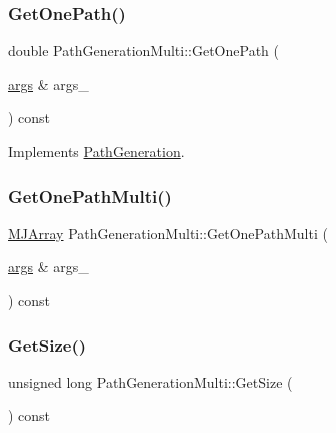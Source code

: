 \subsubsection{\texorpdfstring{Get\+One\+Path()}{GetOnePath()}}
{\footnotesize\ttfamily double Path\+Generation\+Multi\+::\+Get\+One\+Path (\begin{DoxyParamCaption}\item[{\hyperlink{path__generation_8h_a75c13cde2074f502cc4348c70528572d}{args} \&}]{args\+\_\+ }\end{DoxyParamCaption}) const\hspace{0.3cm}{\ttfamily [virtual]}}



Implements \hyperlink{classPathGeneration_a9a64a37f4dd9b2b3ef84f3cb66aed843}{Path\+Generation}.

\hypertarget{classPathGenerationMulti_aeae71235d01a98759c1d075694e8096e}{}\label{classPathGenerationMulti_aeae71235d01a98759c1d075694e8096e} 
\subsubsection{\texorpdfstring{Get\+One\+Path\+Multi()}{GetOnePathMulti()}}
{\footnotesize\ttfamily \hyperlink{classMJArray}{M\+J\+Array} Path\+Generation\+Multi\+::\+Get\+One\+Path\+Multi (\begin{DoxyParamCaption}\item[{\hyperlink{path__generation_8h_a75c13cde2074f502cc4348c70528572d}{args} \&}]{args\+\_\+ }\end{DoxyParamCaption}) const}

\hypertarget{classPathGenerationMulti_ad5e790a4a0555472307292bdcddafe8c}{}\label{classPathGenerationMulti_ad5e790a4a0555472307292bdcddafe8c} 
\subsubsection{\texorpdfstring{Get\+Size()}{GetSize()}}
{\footnotesize\ttfamily unsigned long Path\+Generation\+Multi\+::\+Get\+Size (\begin{DoxyParamCaption}{ }\end{DoxyParamCaption}) const\hspace{0.3cm}{\ttfamily [inline]}}

